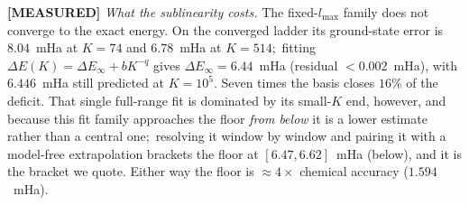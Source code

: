 \documentclass[aps,pra,twocolumn,superscriptaddress,longbibliography]{revtex4-2}
\newcommand{\gvq}[2]{#2}
\begin{document}
\textbf{[MEASURED]} \emph{What the sublinearity costs.}  The fixed-$l_{\max}$
family does not converge to the exact energy.  On the converged ladder its
ground-state error is $8.04$~mHa at $K=74$ and $6.78$~mHa at $K=514$;\ fitting
$\Delta E(K)=\Delta E_\infty + bK^{-q}$ gives
$\Delta E_\infty=\gvq{p60_energy_floor}{6.44}$~mHa (residual $<0.002$~mHa), with
$6.446$~mHa still predicted at $K=10^{5}$.  Seven times the basis closes $16\%$
of the deficit.  That single full-range fit is dominated by its small-$K$ end,
however, and because this fit family approaches the floor \emph{from below} it
is a lower estimate rather than a central one;\ resolving it window by window
and pairing it with a model-free extrapolation brackets the floor at
$[6.47,6.62]$~mHa (below), and it is the bracket we quote.  Either way the
floor is $\approx\!4\times$ chemical accuracy ($1.594$~mHa).
\end{document}
